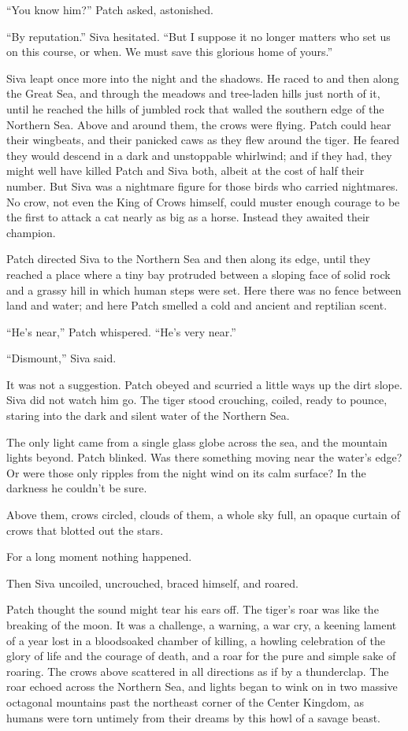 \documentclass[ebook,oneside,openany,12pt]{memoir}
\begin{document}
“You know him?” Patch asked, astonished.

“By reputation.” Siva hesitated. “But I suppose it no longer matters
who set us on this course, or when. We must save this glorious home of
yours.”

Siva leapt once more into the night and the shadows. He raced to and
then along the Great Sea, and through the meadows and tree-laden hills
just north of it, until he reached the hills of jumbled rock that
walled the southern edge of the Northern Sea. Above and around them,
the crows were flying. Patch could hear their wingbeats, and their
panicked caws as they flew around the tiger. He feared they would
descend in a dark and unstoppable whirlwind; and if they had, they
might well have killed Patch and Siva both, albeit at the cost of half
their number. But Siva was a nightmare figure for those birds who
carried nightmares. No crow, not even the King of Crows himself, could
muster enough courage to be the first to attack a cat nearly as big as
a horse. Instead they awaited their champion.

Patch directed Siva to the Northern Sea and then along its edge, until
they reached a place where a tiny bay protruded between a sloping face
of solid rock and a grassy hill in which human steps were set. Here
there was no fence between land and water; and here Patch smelled a
cold and ancient and reptilian scent.

“He’s near,” Patch whispered. “He’s very near.”

“Dismount,” Siva said.

It was not a suggestion. Patch obeyed and scurried a little ways up
the dirt slope. Siva did not watch him go. The tiger stood crouching,
coiled, ready to pounce, staring into the dark and silent water of the
Northern Sea.

The only light came from a single glass globe across the sea, and the
mountain lights beyond. Patch blinked. Was there something moving near
the water’s edge? Or were those only ripples from the night wind on
its calm surface? In the darkness he couldn’t be sure.

Above them, crows circled, clouds of them, a whole sky full, an opaque
curtain of crows that blotted out the stars.

For a long moment nothing happened.

Then Siva uncoiled, uncrouched, braced himself, and roared.

Patch thought the sound might tear his ears off. The tiger’s roar was
like the breaking of the moon. It was a challenge, a warning, a war
cry, a keening lament of a year lost in a bloodsoaked chamber of
killing, a howling celebration of the glory of life and the courage of
death, and a roar for the pure and simple sake of roaring. The crows
above scattered in all directions as if by a thunderclap. The roar
echoed across the Northern Sea, and lights began to wink on in two
massive octagonal mountains past the northeast corner of the Center
Kingdom, as humans were torn untimely from their dreams by this howl
of a savage beast.
\end{document}
